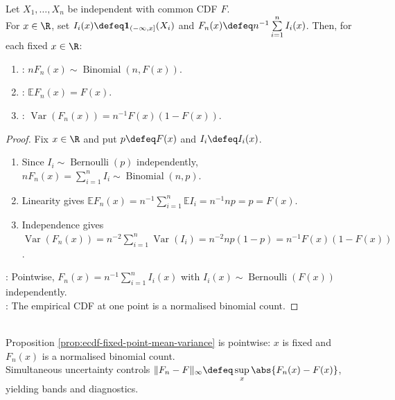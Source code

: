 \begin{proposition} \label{prop:ecdf-fixed-point-mean-variance} \\
Let $X_1,\ldots,X_n$ be independent with common CDF $F$.\\
For $x\in\R$, set $I_i(x)\defeq\mathbf{1}_{(-\infty,x]}(X_i)$ and $F_n(x)\defeq n^{-1}\sum\limits_{i=1}^n I_i(x)$. Then, for each fixed $x\in\R$:
\begin{enumerate}[label=(\roman*)]
\setlength{\itemsep}{0pt}
\item {}: $nF_n(x)\sim\operatorname{Binomial}(n,F(x))$.
\item {}: $\mathbb{E}F_n(x)=F(x)$.
\item {}: $\operatorname{Var}(F_n(x))=n^{-1}F(x)(1-F(x))$.
\end{enumerate}
\begin{proof}
Fix $x\in\R$ and put $p\defeq F(x)$ and $I_i\defeq I_i(x)$.
\begin{enumerate}[label=(\roman*)]
\setlength{\itemsep}{0pt}
\item Since $I_i\sim\operatorname{Bernoulli}(p)$ independently, $nF_n(x)=\sum\limits_{i=1}^n I_i\sim\operatorname{Binomial}(n,p)$.
\item Linearity gives $\mathbb{E}F_n(x)=n^{-1}\sum\limits_{i=1}^n\mathbb{E}I_i=n^{-1}np=p=F(x)$.
\item Independence gives $\operatorname{Var}(F_n(x))=n^{-2}\sum\limits_{i=1}^n\operatorname{Var}(I_i)=n^{-2}np(1-p)=n^{-1}F(x)(1-F(x))$.
\end{enumerate}
: Pointwise, $F_n(x)=n^{-1}\sum\limits_{i=1}^n I_i(x)$ with $I_i(x)\sim\operatorname{Bernoulli}(F(x))$ independently.\\
: The empirical CDF at one point is a normalised binomial count.
\end{proof}
\end{proposition}

\begin{remark} \label{rem:ecdf-simultaneous-versus-pointwise} \\
Proposition \ref{prop:ecdf-fixed-point-mean-variance} is pointwise: $x$ is fixed and $F_n(x)$ is a normalised binomial count.\\
Simultaneous uncertainty controls $\|F_n-F\|_\infty\defeq\sup\limits_x\abs{F_n(x)-F(x)}$, yielding bands and diagnostics.
\end{remark}

